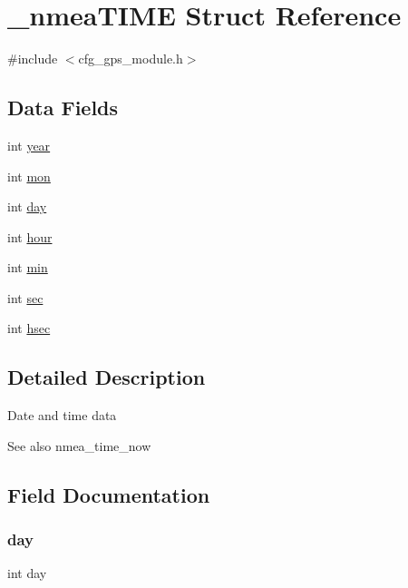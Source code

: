 \hypertarget{struct__nmea_t_i_m_e}{}\section{\+\_\+nmea\+T\+I\+ME Struct Reference}
\label{struct__nmea_t_i_m_e}


{\ttfamily \#include $<$cfg\+\_\+gps\+\_\+module.\+h$>$}

\subsection*{Data Fields}
\begin{DoxyCompactItemize}
\item 
int \hyperlink{struct__nmea_t_i_m_e_abeac221e38b7b9ce7df8722c842bf671}{year}
\item 
int \hyperlink{struct__nmea_t_i_m_e_a25b602fa15f03b01f61a900f1f68a67d}{mon}
\item 
int \hyperlink{struct__nmea_t_i_m_e_a4c11afc03fc3ee49bab660def6558f2a}{day}
\item 
int \hyperlink{struct__nmea_t_i_m_e_a15df9ba285cfd842f284025f904edc9c}{hour}
\item 
int \hyperlink{struct__nmea_t_i_m_e_a3e202b201e6255d975cd6d3aff1f5a4d}{min}
\item 
int \hyperlink{struct__nmea_t_i_m_e_a90c2ace84e5523d06b7162ea5928acc1}{sec}
\item 
int \hyperlink{struct__nmea_t_i_m_e_a71f7cf59ce8561b7b821987c056fe525}{hsec}
\end{DoxyCompactItemize}


\subsection{Detailed Description}
Date and time data \begin{DoxySeeAlso}{See also}
nmea\+\_\+time\+\_\+now 
\end{DoxySeeAlso}


\subsection{Field Documentation}
\mbox{\label{struct__nmea_t_i_m_e_a4c11afc03fc3ee49bab660def6558f2a}} 
\subsubsection{\texorpdfstring{day}{day}}
{\footnotesize\ttfamily int day}

